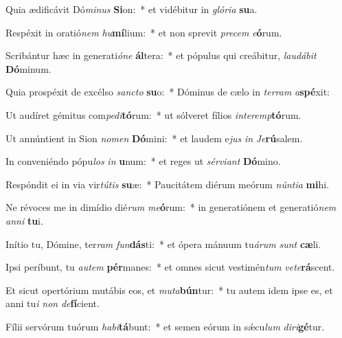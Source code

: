 \item Quia ædificávit Dó\textit{mi}\textit{nus} \textbf{Si}on:~* et vidébitur in \textit{gló}\textit{ri}\textit{a} \textbf{su}a.
\item Respéxit in oratió\textit{nem} \textit{hu}\textbf{mí}lium:~* et non sprevit \textit{pre}\textit{cem} \textit{e}\textbf{ó}rum.
\item Scribántur hæc in generati\textit{ó}\textit{ne} \textbf{ál}tera:~* et pópulus qui creábitur, \textit{lau}\textit{dá}\textit{bit} \textbf{Dó}minum.
\item Quia prospéxit de excélso \textit{sanc}\textit{to} \textbf{su}o:~* Dóminus de cælo in \textit{ter}\textit{ram} \textit{a}\textbf{spé}xit:
\item Ut audíret gémitus com\textit{pe}\textit{di}\textbf{tó}rum:~* ut sólveret fílios \textit{in}\textit{ter}\textit{emp}\textbf{tó}rum.
\item Ut annúntient in Sion \textit{no}\textit{men} \textbf{Dó}mini:~* et laudem e\textit{jus} \textit{in} \textit{Je}\textbf{rú}salem.
\item In conveniéndo pópu\textit{los} \textit{in} \textbf{u}num:~* et reges ut \textit{sér}\textit{vi}\textit{ant} \textbf{Dó}mino.
\item Respóndit ei in via vir\textit{tú}\textit{tis} \textbf{su}æ:~* Paucitátem diérum meórum \textit{nún}\textit{ti}\textit{a} \textbf{mi}hi.
\item Ne révoces me in dimídio dié\textit{rum} \textit{me}\textbf{ó}rum:~* in generatiónem et generatió\textit{nem} \textit{an}\textit{ni} \textbf{tu}i.
\item Inítio tu, Dómine, ter\textit{ram} \textit{fun}\textbf{dás}ti:~* et ópera mánuum tu\textit{á}\textit{rum} \textit{sunt} \textbf{cæ}li.
\item Ipsi períbunt, tu \textit{au}\textit{tem} \textbf{pér}manes:~* et omnes sicut vestimén\textit{tum} \textit{ve}\textit{te}\textbf{rá}scent.
\item Et sicut opertórium mutábis eos, et \textit{mu}\textit{ta}\textbf{bún}tur:~* tu autem idem ipse es, et anni tu\textit{i} \textit{non} \textit{de}\textbf{fí}cient.
\item Fílii servórum tuórum \textit{ha}\textit{bi}\textbf{tá}bunt:~* et semen eórum in sǽcu\textit{lum} \textit{di}\textit{ri}\textbf{gé}tur.
